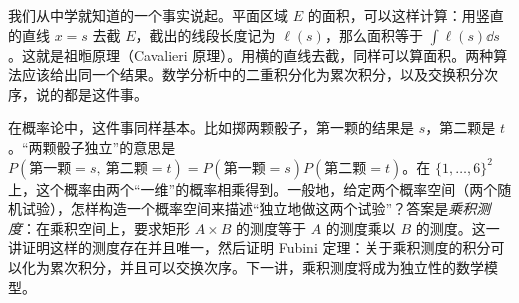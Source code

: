 \label{lec:product-measures}

我们从中学就知道的一个事实说起。平面区域 $E$ 的面积，可以这样计算：用竖直的直线 $x=s$ 去截 $E$，截出的线段长度记为 $\ell(s)$，那么面积等于 $\int\ell(s)\dd s$。这就是祖暅原理（Cavalieri 原理）。用横的直线去截，同样可以算面积。两种算法应该给出同一个结果。数学分析中的二重积分化为累次积分，以及交换积分次序，说的都是这件事。

在概率论中，这件事同样基本。比如掷两颗骰子，第一颗的结果是 $s$，第二颗是 $t$。“两颗骰子独立”的意思是 $P(\text{第一颗}=s,\ \text{第二颗}=t)=P(\text{第一颗}=s)P(\text{第二颗}=t)$。在 $\{1,\dots,6\}^2$ 上，这个概率由两个“一维”的概率相乘得到。一般地，给定两个概率空间（两个随机试验），怎样构造一个概率空间来描述“独立地做这两个试验”？答案是\emph{乘积测度}：在乘积空间上，要求矩形 $A\times B$ 的测度等于 $A$ 的测度乘以 $B$ 的测度。这一讲证明这样的测度存在并且唯一，然后证明 Fubini 定理：关于乘积测度的积分可以化为累次积分，并且可以交换次序。下一讲，乘积测度将成为独立性的数学模型。


